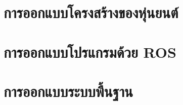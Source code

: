 \section{การออกแบบโครงสร้างของหุ่นยนต์}


\clearpage
\section{การออกแบบโปรแกรมด้วย ROS}


\clearpage
\section{การออกแบบระบบพื้นฐาน}


